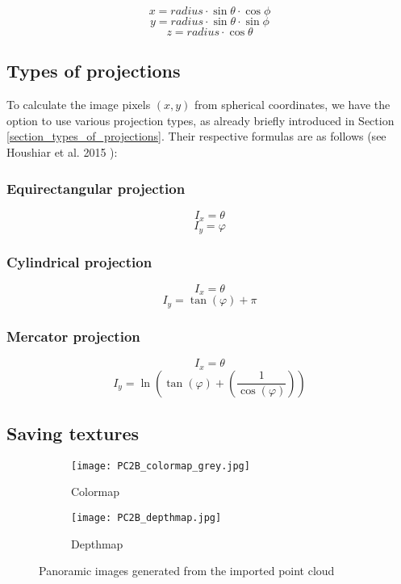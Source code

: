 $$x = radius \cdot \sin \theta \cdot \cos \phi$$
$$y = radius \cdot \sin \theta \cdot \sin \phi$$
$$z = radius \cdot \cos \theta$$

\subsection{Types of projections}

To calculate the image pixels {$(x, y)$} from spherical coordinates, we have the option to use various projection types, as already briefly introduced in Section \ref{section_types_of_projections}. Their respective formulas are as follows (see Houshiar et al. 2015 \parencite{houshiar2015a}):

\subsubsection{Equirectangular projection}

$$I_x = \theta$$
$$I_y = \varphi$$

\subsubsection{Cylindrical projection}

$$I_x = \theta$$
$$I_y = \tan(\varphi) + \pi$$

\subsubsection{Mercator projection}

$$I_x = \theta$$
$$I_y = \ln \left(  \tan \left( \varphi \right) +  \left( \frac{1}{ \cos(\varphi) } \right) \right)$$

\subsection{Saving textures}

\begin{figure}[h]
	\centering
	\begin{subfigure}[b]{0.45\textwidth}
		\centering
		\texttt{[image: PC2B\_colormap\_grey.jpg]}
		\caption{Colormap}
		\label{fig:PC2B_colormap_grey}
	\end{subfigure}
	\hfill
	\begin{subfigure}[b]{0.45\textwidth}
		\centering
		\texttt{[image: PC2B\_depthmap.jpg]}
		\caption{Depthmap}
		\label{fig:PC2B_depthmap}
	\end{subfigure}
	\caption{Panoramic images generated from the imported point cloud}
	\label{fig:PC2B_Panorama_images}
\end{figure}

